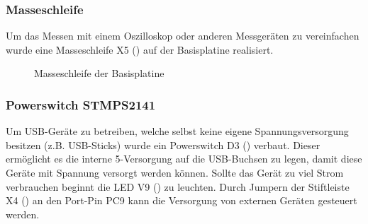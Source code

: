 \subsubsection{Masseschleife}
Um das Messen mit einem Oszilloskop oder anderen Messgeräten zu vereinfachen wurde eine Masseschleife X5 () auf der \gls{Basisplatine} realisiert.

\begin{figure}[H]
    \centering
    \qquad
    \qquad
    \caption[Masseschleife der Basisplatine]{Masseschleife der \gls{Basisplatine}}
    \label{fig:basisplatine-masse}
\end{figure}

\subsubsection{Powerswitch STMPS2141}
Um USB-Geräte zu betreiben, welche selbst keine eigene Spannungsversorgung besitzen (z.B. USB-Sticks) wurde ein Powerswitch D3 () verbaut. Dieser ermöglicht es die interne \unit{5}{\volt}-Versorgung auf die USB-Buchsen zu legen, damit diese Geräte mit Spannung versorgt werden können. Sollte das Gerät zu viel Strom verbrauchen beginnt die LED V9 () zu leuchten. Durch Jumpern der Stiftleiste X4 () an den Port-Pin PC9 kann die Versorgung von externen Geräten gesteuert werden.

